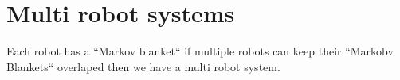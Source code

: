 \chapter{Multi robot systems}
    Each robot has a ``Markov blanket`` if multiple robots can keep their ``Markobv Blankets`` overlaped then we have a multi robot system.
    